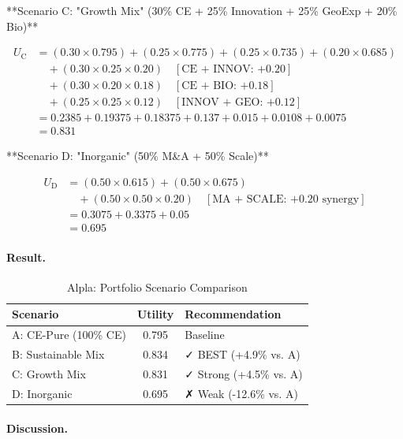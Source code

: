 **Scenario C: "Growth Mix" (30\% CE + 25\% Innovation + 25\% GeoExp + 20\% Bio)**

\begin{align}
U_{\text{C}} &= (0.30 \times 0.795) + (0.25 \times 0.775) + (0.25 \times 0.735) + (0.20 \times 0.685) \\
&\quad + (0.30 \times 0.25 \times 0.20) \quad [\text{CE + INNOV: +0.20}] \\
&\quad + (0.30 \times 0.20 \times 0.18) \quad [\text{CE + BIO: +0.18}] \\
&\quad + (0.25 \times 0.25 \times 0.12) \quad [\text{INNOV + GEO: +0.12}] \\
&= 0.2385 + 0.19375 + 0.18375 + 0.137 + 0.015 + 0.0108 + 0.0075 \\
&= 0.831
\end{align}

**Scenario D: "Inorganic" (50\% M\&A + 50\% Scale)**

\begin{align}
U_{\text{D}} &= (0.50 \times 0.615) + (0.50 \times 0.675) \\
&\quad + (0.50 \times 0.50 \times 0.20) \quad [\text{MA + SCALE: +0.20 synergy}] \\
&= 0.3075 + 0.3375 + 0.05 \\
&= 0.695
\end{align}

\paragraph{Result.}

\begin{table}[htbp]
\centering
\caption{Alpla: Portfolio Scenario Comparison}
\label{tab:alpla-scenarios}
\renewcommand{\arraystretch}{1.3}
\begin{tabular}{@{}lcl@{}}
\toprule
\textbf{Scenario} & \textbf{Utility} & \textbf{Recommendation} \\
\midrule
A: CE-Pure (100\% CE) & 0.795 & Baseline \\
B: Sustainable Mix & 0.834 & ✓ BEST (+4.9\% vs. A) \\
C: Growth Mix & 0.831 & ✓ Strong (+4.5\% vs. A) \\
D: Inorganic & 0.695 & ✗ Weak (-12.6\% vs. A) \\
\bottomrule
\end{tabular}
\end{table}

\paragraph{Discussion.}

